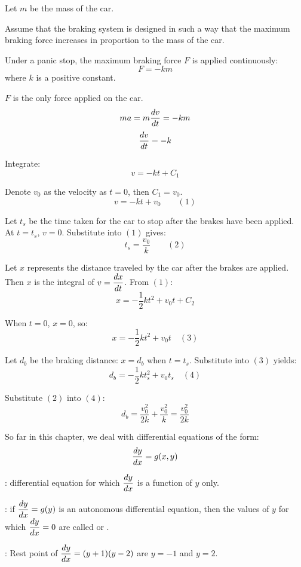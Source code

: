   \par Let $m$ be the mass of the car.
  \par Assume that the braking system is designed in such a way that the maximum braking force increases in proportion to the mass of the car.
  \par Under a panic stop, the maximum braking force $F$ is applied continuously:
  \[
    F = -km
  \]
  where $k$ is a positive constant.
  \par $F$ is the only force applied on the car.
    \[
      ma = m \dfrac{d v}{d t} = -km      
      \]
    \[
      \dfrac{d v}{d t} = -k
      \]
  \par Integrate:
      \[
        v = -kt + C_1
        \]
  \par Denote $v_0$ as the velocity as $t = 0$, then $C_1 = v_0$.
      \[
        v = -kt + v_0 \qquad (1)
      \]
  \par Let $t_s$ be the time taken for the car to stop after the brakes have been applied. At $t = t_s$, $v = 0$. Substitute into $(1)$ gives:
      \[
        t_s = \frac{v_0}{k} \qquad (2)
        \]
  \par Let $x$ represents the distance traveled by the car after the brakes are applied. Then $x$ is the integral of $v = \dfrac{d x}{d t}$. From $(1)$:
    \[
      x = -\frac{1}{2} kt^2 + v_0 t + C_2
      \]
  \par When $t = 0$, $x = 0$, so:
  \[
    x = -\frac{1}{2} kt^2 + v_0 t \quad (3)
  \]
  \par Let $d_b$ be the braking distance: $x = d_b$ when $t = t_s$. Substitute into $(3)$ yields:
  \[
    d_b = -\frac{1}{2} k t_s^2 + v_0 t_s \quad (4)
  \]
  \par Substitute $(2)$ into $(4)$:
  \[
    d_b = \frac{v_0^2}{2k} + \frac{v_0^2}{k} = \frac{v_0^2}{2k}
  \]

  \par So far in this chapter, we deal with differential equations of the form:
    \[
      \dfrac{d y}{d x} = g(x, y)
      \]
  \par {}: differential equation for which $\dfrac{d y}{d x}$ is a function of $y$ only.
  \par {}: if $\dfrac{d y}{d x} = g(y)$ is an autonomous differential equation, then the values of $y$ for which $\dfrac{d y}{d x} = 0$ are called  or .
  \par {}: Rest point of $\dfrac{d y}{d x} = (y + 1)(y - 2)$ are $y = -1$ and $y = 2$.

    \href{https://www.youtube.com/watch?v=DYi8KTt8688}{}

  
